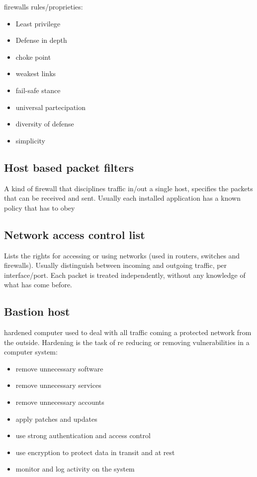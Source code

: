 firewalls rules/proprieties:
\begin{itemize}
    \item Least privilege
    \item Defense in depth
    \item choke point
    \item weakest links
    \item fail-safe stance
    \item universal partecipation
    \item diversity of defense
    \item simplicity
\end{itemize}

\subsection{Host based packet filters}
A kind of firewall that disciplines traffic in/out a single host, specifies the packets that can be received and sent. Usually each installed application has a known policy that has to obey

\subsection{Network access control list}
Lists the rights for accessing or using networks (used in routers, switches and firewalls). Usually distinguish between incoming
and outgoing traffic, per interface/port. Each packet is treated independently, without any knowledge of what
has come before.

\subsection{Bastion host}
hardened computer used to deal with all traffic coming a protected network from the outside.
Hardening is the task of re reducing or removing vulnerabilities in a computer system:
\begin{itemize}
    \item remove unnecessary software
    \item remove unnecessary services
    \item remove unnecessary accounts
    \item apply patches and updates
    \item use strong authentication and access control
    \item use encryption to protect data in transit and at rest
    \item monitor and log activity on the system
\end{itemize}

